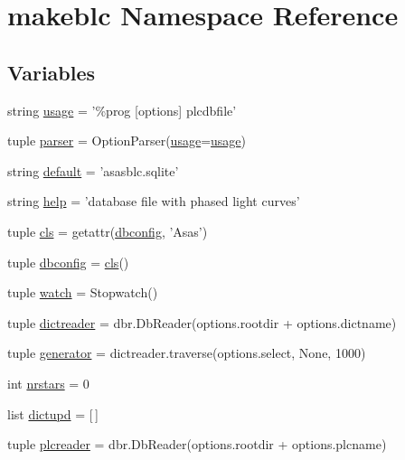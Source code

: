 \hypertarget{namespacemakeblc}{
\section{makeblc Namespace Reference}
\label{namespacemakeblc}
}
\subsection*{Variables}
\begin{DoxyCompactItemize}
\item 
string \hyperlink{namespacemakeblc_af9d26964de16c4985555854c8d72580b}{usage} = '\%prog \mbox{[}options\mbox{]} plcdbfile'
\item 
tuple \hyperlink{namespacemakeblc_a0dea09705bbc782eda44fd29626ff35b}{parser} = OptionParser(\hyperlink{namespacemakeblc_af9d26964de16c4985555854c8d72580b}{usage}=\hyperlink{namespacemakeblc_af9d26964de16c4985555854c8d72580b}{usage})
\item 
string \hyperlink{namespacemakeblc_a65838550e6d468b9df26e64e07388457}{default} = 'asasblc.sqlite'
\item 
string \hyperlink{namespacemakeblc_a6dea7c4e16e828d56e7094476327ae97}{help} = 'database file with phased light curves'
\item 
tuple \hyperlink{namespacemakeblc_a76c6a65c85e7590a747c0f90985c02c6}{cls} = getattr(\hyperlink{namespacemakeblc_a69d352c98ad45dc93ce0c036904382ea}{dbconfig}, 'Asas')
\item 
tuple \hyperlink{namespacemakeblc_a69d352c98ad45dc93ce0c036904382ea}{dbconfig} = \hyperlink{namespacemakeblc_a76c6a65c85e7590a747c0f90985c02c6}{cls}()
\item 
tuple \hyperlink{namespacemakeblc_ac747659361bfa898ab3b4503fd962e9c}{watch} = Stopwatch()
\item 
tuple \hyperlink{namespacemakeblc_a076cfa54febea93ec0a0367d9766b59b}{dictreader} = dbr.DbReader(options.rootdir + options.dictname)
\item 
tuple \hyperlink{namespacemakeblc_a0eac396194b25b741b019161364a481e}{generator} = dictreader.traverse(options.select, None, 1000)
\item 
int \hyperlink{namespacemakeblc_abd854e539cc9c9fe5d64b72438f277f2}{nrstars} = 0
\item 
list \hyperlink{namespacemakeblc_aaf2dbaa320a13bde9a473d47104f7cb4}{dictupd} = \mbox{[}$\,$\mbox{]}
\item 
tuple \hyperlink{namespacemakeblc_a0f835803cfdefeaeb151f6a83e76368f}{plcreader} = dbr.DbReader(options.rootdir + options.plcname)

\end{DoxyCompactItemize}
